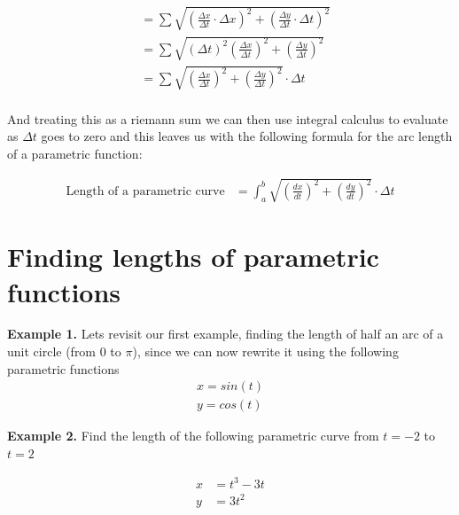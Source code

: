 \documentclass[10pt]{extarticle}
\begin{document}
\begin{align} 
    &= \sum \sqrt{(\frac{\Delta x}{\Delta t} \cdot \Delta x)^2 + (\frac{\Delta y}{\Delta t} \cdot \Delta t) ^ 2} \\ 
    &= \sum \sqrt{(\Delta t)^2(\frac{\Delta x}{\Delta t})^2 + (\frac{\Delta y}{\Delta t}) ^ 2} \\ 
    &= \sum \sqrt{(\frac{\Delta x}{\Delta t})^2 + (\frac{\Delta y}{\Delta t}) ^ 2} \cdot \Delta t \\ 
\end{align}

And treating this as a riemann sum we can then use integral calculus to evaluate as $\Delta t$ goes to zero and this leaves us with the following formula for the arc length of a parametric function:

\begin{align} 
    \text{Length of a parametric curve} &= \int_{a}^{b} \sqrt{(\frac{dx}{dt})^2 + (\frac{dy}{dt}) ^ 2} \cdot \Delta t  
\end{align}

\section{Finding lengths of parametric functions}

\textbf{Example 1.} Lets revisit our first example, finding the length of half an arc of a unit circle (from $0$ to $\pi$), since we can now rewrite it using the following parametric functions
\begin{align} 
    x = sin(t) \\ 
    y = cos(t) 
\end{align}

\vspace{8cm}

\textbf{Example 2.} Find the length of the following parametric curve from $t = -2$ to $t = 2$

\begin{align} 
    x &= t^3 - 3t \\ 
    y &= 3t^2  
\end{align}
\end{document}
